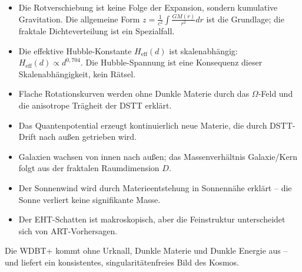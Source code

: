 \begin{itemize}
    \item Die Rotverschiebung ist keine Folge der Expansion, sondern kumulative Gravitation. Die allgemeine Form \( z = \frac{1}{c^2} \int \frac{GM(r)}{r^2} dr \) ist die Grundlage; die fraktale Dichteverteilung ist ein Spezialfall.
    \item Die effektive Hubble-Konstante \( H_{\text{eff}}(d) \) ist skalenabhängig: \( H_{\text{eff}}(d) \propto d^{0,704} \). Die Hubble-Spannung ist eine Konsequenz dieser Skalenabhängigkeit, kein Rätsel.
    \item Flache Rotationskurven werden ohne Dunkle Materie durch das \( \Omega \)-Feld und die anisotrope Trägheit der DSTT erklärt.
    \item Das Quantenpotential erzeugt kontinuierlich neue Materie, die durch DSTT-Drift nach außen getrieben wird.
    \item Galaxien wachsen von innen nach außen; das Massenverhältnis Galaxie/Kern folgt aus der fraktalen Raumdimension \( D \).
    \item Der Sonnenwind wird durch Materieentstehung in Sonnennähe erklärt – die Sonne verliert keine signifikante Masse.
    \item Der EHT-Schatten ist makroskopisch, aber die Feinstruktur unterscheidet sich von ART-Vorhersagen.
\end{itemize}

Die WDBT+ kommt ohne Urknall, Dunkle Materie und Dunkle Energie aus – und liefert ein konsistentes, singularitätenfreies Bild des Kosmos.
